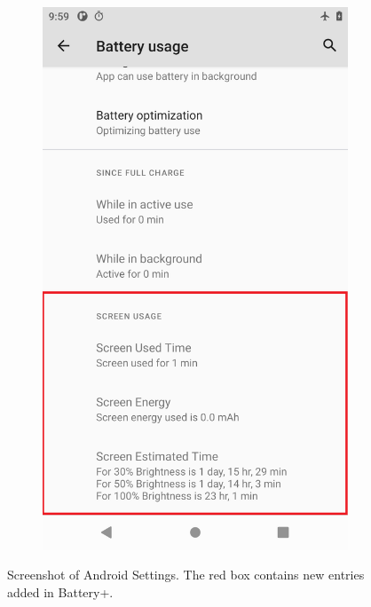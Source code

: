 \begin{figure}[tp]
\begin{minipage}{0.35\columnwidth}
	\begin{subfigure}[]{\textwidth}
		\includegraphics[width=\textwidth]{figure/001_Battery_app_screencap.png}
	\end{subfigure}
        \vspace{-0.1in}
	\caption{Screenshot of Android Settings.
          The red box contains new entries added in Battery+.}

\end{minipage}
\end{figure}
